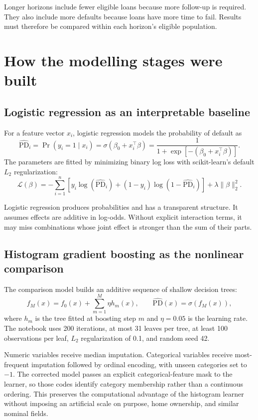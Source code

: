 \documentclass[11pt]{article}
\newcommand{\pd}{\widehat{\mathrm{PD}}}
\begin{document}
Longer horizons include fewer eligible loans because more follow-up is required.
They also include more defaults because loans have more time to fail. Results must
therefore be compared within each horizon's eligible population.

\section{How the modelling stages were built}

\subsection{Logistic regression as an interpretable baseline}

For a feature vector $x_i$, logistic regression models the probability of default
as
\[
  \pd_i = \Pr(y_i=1\mid x_i)
  = \sigma(\beta_0 + x_i^\top\beta)
  = \frac{1}{1+\exp[-(\beta_0+x_i^\top\beta)]}.
\]
The parameters are fitted by minimizing binary log loss with scikit-learn's
default $L_2$ regularization:
\[
  \mathcal{L}(\beta)
  = -\sum_{i=1}^{n}\left[
      y_i\log(\pd_i) + (1-y_i)\log(1-\pd_i)
    \right]
    + \lambda\lVert\beta\rVert_2^2.
\]

Logistic regression produces probabilities and has a transparent structure. It
assumes effects are additive in log-odds. Without explicit interaction terms, it
may miss combinations whose joint effect is stronger than the sum of their parts.

\subsection{Histogram gradient boosting as the nonlinear comparison}

The comparison model builds an additive sequence of shallow decision trees:
\[
  f_M(x) = f_0(x) + \sum_{m=1}^{M}\eta h_m(x),
  \qquad
  \pd(x) = \sigma\!\left(f_M(x)\right),
\]
where $h_m$ is the tree fitted at boosting step $m$ and $\eta=0.05$ is the learning
rate. The notebook uses 200 iterations, at most 31 leaves per tree, at least 100
observations per leaf, $L_2$ regularization of 0.1, and random seed 42.

Numeric variables receive median imputation. Categorical variables receive
most-frequent imputation followed by ordinal encoding, with unseen categories set
to $-1$. The corrected model passes an explicit categorical-feature mask to the
learner, so those codes identify category membership rather than a continuous
ordering. This preserves the computational advantage of the histogram learner
without imposing an artificial scale on purpose, home ownership, and similar
nominal fields.
\end{document}
